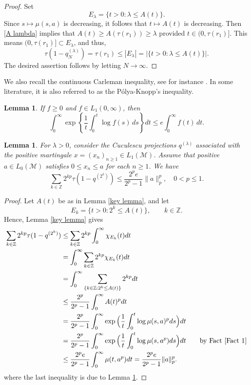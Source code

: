 \documentclass[11]{amsart}
\numberwithin{equation}{section}
\newtheorem{lemma}[theorem]{Lemma}
\begin{document}
\begin{proof}
	Set 
	\begin{equation*}
		E_{\lambda}=\{t>0:\lambda\leq A(t)\}.
	\end{equation*}
	Since $s\mapsto \mu(s,a)$ is decreasing, it follows that   $t\mapsto A(t)$ is decreasing.  Then \eqref{A lambda} implies that $A(t)\geq A(\tau(r_1))\geq \lambda$ provided $t\in (0,\tau(r_1)]$. 
	This means $(0,\tau(r_1)]\subset E_{\lambda}$, and thus,
	\[	\tau(1-q_N^{(\lambda)})=\tau(r_1)\leq |E_{\lambda}|=  |\{t>0: \lambda\leq A(t)\}|.\]
	The desired assertion follows by letting $N\to\infty$.
\end{proof}

We also recall the continuous Carleman inequality,  see for instance \cite[p. 250]{HLP1988}. In some literature, it is also referred to as the  P\'olya-Knopp’s inequality.
\begin{lemma}\label{lem:continuous-carleman}
	If $f\ge0$ and $f\in L_1(0,\infty)$, then
	\begin{equation*}
		\int_0^\infty
		\exp\left\{\frac1t\int_0^t\log f(s)\,ds\right\}dt
		\le e\int_0^\infty f(t)\,dt.
	\end{equation*}
\end{lemma}

\begin{lemma}\label{L1 e1}
	For $\lambda>0$, consider the Cuculescu projections $q^{(\lambda)}$ associated with the positive martingale 	 $x=(x_n)_{n\geq1}\in L_1(\mathcal{M})$.  Assume that	positive $a\in L_0(\mathcal{M})$ satisfies $0\leq x_n\leq a$ for each $n\geq1$. We have 
	$$\sum_{k\in \mathbb{Z}} 2^{kp}\tau(1-q^{(2^k)})\leq \frac{2^pe}{2^p-1}\|a\|_p^p,\quad 0<p\leq 1.$$
\end{lemma}

\begin{proof}
	Let $A(t)$ be as in Lemma \ref{key lemma}, and let 
	\begin{equation*}
		E_{k}=\{t>0:2^k\leq A(t)\},\qquad k\in \mathbb{Z}.
	\end{equation*}
	Hence, Lemma \ref{key lemma} gives 
	\begin{align*}
		\sum_{k\in \mathbb{Z}} 2^{kp}\tau(1-q^{(2^k)})&\leq \sum_{k\in \mathbb{Z}} 2^{kp}\int_0^{\infty}\chi_{E_k}(t)dt\\
		&= \int_0^{\infty}\sum_{k\in \mathbb{Z}} 2^{kp}\chi_{E_k}(t)dt\\
		&=\int_0^{\infty}\sum_{\{k\in \mathbb{Z}: 2^k\leq A(t)\}} 2^{kp}dt\\
		&\leq \frac{2^p}{2^p-1}\int_0^{\infty}A(t)^pdt\\
		&=\frac{2^p}{2^p-1}\int_0^{\infty}\exp\Big(\frac{1}{t}\int_0^t\log\mu(s,a)^pds\Big)dt\\
		&=\frac{2^p}{2^p-1}\int_0^{\infty}\exp\Big(\frac{1}{t}\int_0^t\log\mu(s,a^p)ds\Big)dt \qquad \mbox{by Fact \ref{Fact 1}}\\
		&\leq \frac{2^pe}{2^p-1} \int_0^{\infty} \mu(t,a^p)dt= \frac{2^pe}{2^p-1} \|a\|_p^p.
	\end{align*}
	where  the last inequality is due to  Lemma \ref{lem:continuous-carleman}.
\end{proof}
\end{document}
